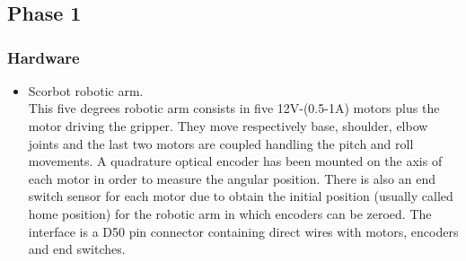 

\chapter{}
\vspace*{1cm}

\section{Phase 1}
\subsection{Hardware}
\begin{itemize}
\item Scorbot robotic arm. \\
   This five degrees robotic arm consists in five 12V-(0.5-1A) motors plus the motor driving the gripper. They move respectively base, shoulder, elbow joints and the last two motors are coupled handling the pitch and roll movements. A quadrature optical encoder has been mounted on the axis of each motor in order to measure the angular position. There is also an end switch sensor for each motor due to obtain the initial position (usually called home position) for the robotic arm in which encoders can be zeroed. The interface is a D50 pin connector containing direct wires with motors, encoders and end switches.
 

\end{itemize}
